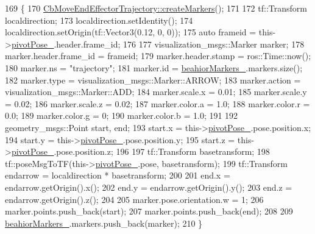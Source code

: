 \begin{DoxyCode}
169     \{
170         \hyperlink{classcl__move__group__interface_1_1CbMoveEndEffectorTrajectory_a442efa1d5bc9e9a16f74ecd31b13d9b5}{CbMoveEndEffectorTrajectory::createMarkers}();
171 
172         tf::Transform localdirection;
173         localdirection.setIdentity();
174         localdirection.setOrigin(tf::Vector3(0.12, 0, 0));
175         \textcolor{keyword}{auto} frameid = this->\hyperlink{classcl__move__group__interface_1_1CbCircularPouringMotion_a58ce9c29e4ef8f09a7569d6d8f9df56b}{pivotPose\_}.header.frame\_id;
176 
177         visualization\_msgs::Marker marker;
178         marker.header.frame\_id = frameid;
179         marker.header.stamp = ros::Time::now();
180         marker.ns = \textcolor{stringliteral}{"trajectory"};
181         marker.id = \hyperlink{classcl__move__group__interface_1_1CbMoveEndEffectorTrajectory_a809fb5385adf27c0a1c8f8136566949c}{beahiorMarkers\_}.markers.size();
182         marker.type = visualization\_msgs::Marker::ARROW;
183         marker.action = visualization\_msgs::Marker::ADD;
184         marker.scale.x = 0.01;
185         marker.scale.y = 0.02;
186         marker.scale.z = 0.02;
187         marker.color.a = 1.0;
188         marker.color.r = 0.0;
189         marker.color.g = 0;
190         marker.color.b = 1.0;
191 
192         geometry\_msgs::Point start, end;
193         start.x = this->\hyperlink{classcl__move__group__interface_1_1CbCircularPouringMotion_a58ce9c29e4ef8f09a7569d6d8f9df56b}{pivotPose\_}.pose.position.x;
194         start.y = this->\hyperlink{classcl__move__group__interface_1_1CbCircularPouringMotion_a58ce9c29e4ef8f09a7569d6d8f9df56b}{pivotPose\_}.pose.position.y;
195         start.z = this->\hyperlink{classcl__move__group__interface_1_1CbCircularPouringMotion_a58ce9c29e4ef8f09a7569d6d8f9df56b}{pivotPose\_}.pose.position.z;
196 
197         tf::Transform basetransform;
198         tf::poseMsgToTF(this->\hyperlink{classcl__move__group__interface_1_1CbCircularPouringMotion_a58ce9c29e4ef8f09a7569d6d8f9df56b}{pivotPose\_}.pose, basetransform);
199         tf::Transform endarrow = localdirection * basetransform;
200 
201         end.x = endarrow.getOrigin().x();
202         end.y = endarrow.getOrigin().y();
203         end.z = endarrow.getOrigin().z();
204 
205         marker.pose.orientation.w = 1;
206         marker.points.push\_back(start);
207         marker.points.push\_back(end);
208 
209         \hyperlink{classcl__move__group__interface_1_1CbMoveEndEffectorTrajectory_a809fb5385adf27c0a1c8f8136566949c}{beahiorMarkers\_}.markers.push\_back(marker);
210     \}
\end{DoxyCode}
